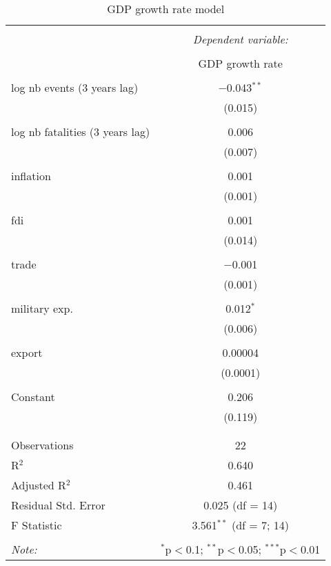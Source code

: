 
\begin{table}[!htbp] \centering 
  \caption{GDP growth rate model} 
  \label{} 
\begin{tabular}{@{\extracolsep{5pt}}lc} 
\\[-1.8ex]\hline 
\hline \\[-1.8ex] 
 & \multicolumn{1}{c}{\textit{Dependent variable:}} \\ 
\cline{2-2} 
\\[-1.8ex] & GDP growth rate \\ 
\hline \\[-1.8ex] 
 log nb events (3 years lag) & $-$0.043$^{**}$ \\ 
  & (0.015) \\ 
  & \\ 
 log nb fatalities (3 years lag) & 0.006 \\ 
  & (0.007) \\ 
  & \\ 
 inflation & 0.001 \\ 
  & (0.001) \\ 
  & \\ 
 fdi & 0.001 \\ 
  & (0.014) \\ 
  & \\ 
 trade & $-$0.001 \\ 
  & (0.001) \\ 
  & \\ 
 military exp. & 0.012$^{*}$ \\ 
  & (0.006) \\ 
  & \\ 
 export & 0.00004 \\ 
  & (0.0001) \\ 
  & \\ 
 Constant & 0.206 \\ 
  & (0.119) \\ 
  & \\ 
\hline \\[-1.8ex] 
Observations & 22 \\ 
R$^{2}$ & 0.640 \\ 
Adjusted R$^{2}$ & 0.461 \\ 
Residual Std. Error & 0.025 (df = 14) \\ 
F Statistic & 3.561$^{**}$ (df = 7; 14) \\ 
\hline 
\hline \\[-1.8ex] 
\textit{Note:}  & \multicolumn{1}{r}{$^{*}$p$<$0.1; $^{**}$p$<$0.05; $^{***}$p$<$0.01} \\ 
\end{tabular} 
\end{table} 
